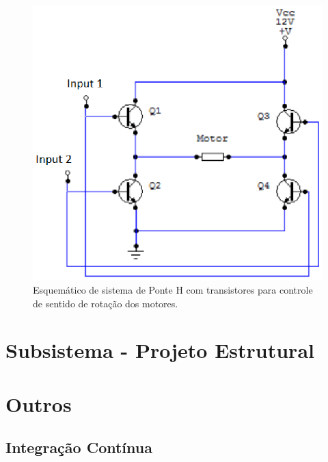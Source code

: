 \begin{figure}[H]
  \centering
    \includegraphics[width=\textwidth]{figuras/ponte_h.eps}
  \caption{Esquemático de sistema de Ponte H com transistores para controle de sentido de rotação dos motores.}
  \label{fig:ponte_h}
\end{figure}

\section{Subsistema - Projeto Estrutural}

\section{Outros}

\subsection{Integração Contínua}

